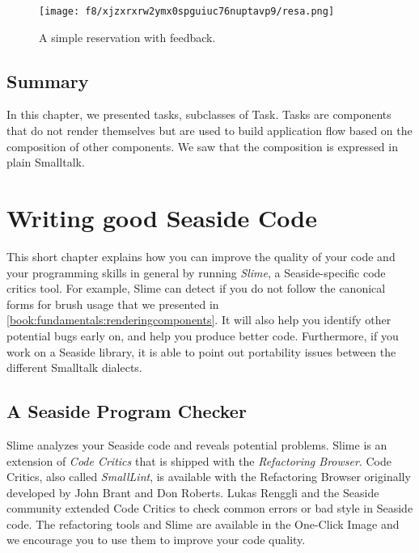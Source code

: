 \documentclass[a4paper,10pt,twoside]{book}
\newcommand{\ct}[1]{{\small\ttfamily\textup{#1}}}
\begin{document}
\begin{figure}[h!tbp]
	\begin{center}
		\texttt{[image: f8/xjzxrxrw2ymx0spguiuc76nuptavp9/resa.png]}
		\caption{A simple reservation with feedback.\label{book:components:tasks:embedding:resa}}
	\end{center}
\end{figure}


\section{Summary}
\label{book:components:tasks:summary}

In this chapter, we presented tasks, subclasses of \ct{Task}. Tasks are components that do not render themselves but are used to build application flow based on the composition of other components. We saw that the composition is expressed in plain Smalltalk.

\chapter{Writing good Seaside Code}
\label{book:components:slime}

This short chapter explains how you can improve the quality of your code and your programming skills in general by running \textit{Slime}, a Seaside-specific code critics tool. For example, Slime can detect if you do not follow the canonical forms for brush usage that we presented in \autoref{book:fundamentals:renderingcomponents}. It will also help you identify other potential bugs early on, and help you produce better code. Furthermore, if you work on a Seaside library, it is able to point out portability issues between the different Smalltalk dialects.

\section{A Seaside Program Checker}
\label{book:components:slime:programchecker}

Slime analyzes your Seaside code and reveals potential problems. Slime is an extension of \textit{Code Critics} that is shipped with the \textit{Refactoring Browser}. Code Critics, also called \textit{SmallLint}, is available with the Refactoring Browser originally developed by John Brant and Don Roberts. Lukas Renggli and the Seaside community extended Code Critics to check common errors or bad style in Seaside code. The refactoring tools and Slime are available in the One-Click Image and we encourage you to use them to improve your code quality. 
\end{document}
